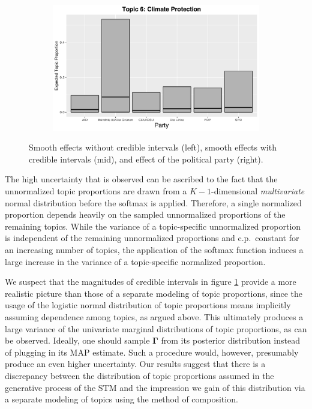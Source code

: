 \begin{figure}[h!]
\begin{subfigure}[b]{0.3\linewidth}
    \includegraphics[width=\linewidth]{../plots/5_1/direct_t6_cat.pdf}
  \end{subfigure}
  \caption{Smooth effects without credible intervals (left), smooth effects with credible intervals (mid), and effect of the political party (right).}
  \label{fig:directassessment}
\end{figure}

The high uncertainty that is observed can be ascribed to the fact that the unnormalized topic proportions are drawn from a $K-1$-dimensional \textit{multivariate} normal distribution before the softmax is applied. Therefore, a single normalized proportion depends heavily on the sampled unnormalized proportions of the remaining topics. While the variance of a topic-specific unnormalized proportion is independent of the remaining unnormalized proportions and c.p.\ constant for an increasing number of topics, the application of the softmax function induces a large increase in the variance of a topic-specific normalized proportion.

We suspect that the magnitudes of credible intervals in figure \ref{fig:directassessment} provide a more realistic picture than those of a separate modeling of topic proportions, since the usage of the logistic normal distribution of topic proportions means implicitly assuming dependence among topics, as argued above. This ultimately produces a large variance of the univariate marginal distributions of topic proportions, as can be observed. Ideally, one should sample $\boldsymbol{\Gamma}$ from its posterior distribution instead of plugging in its MAP estimate. Such a procedure would, however, presumably produce an even higher uncertainty. Our results suggest that there is a discrepancy between the distribution of topic proportions assumed in the generative process of the STM and the impression we gain of this distribution via a separate modeling of topics using the method of composition.

